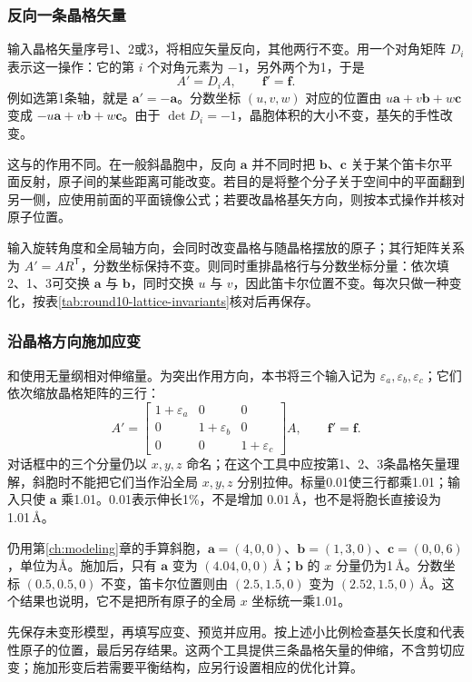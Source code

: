 \subsubsection{反向一条晶格矢量}

输入晶格矢量序号1、2或3，将相应矢量反向，其他两行不变。用一个对角矩阵 $D_i$ 表示这一操作：它的第 $i$ 个对角元素为 $-1$，另外两个为1，于是
\begin{equation}
 A'=D_iA,\qquad \mathbf f'=\mathbf f.
 \label{eq:mirror-lattice-row}
\end{equation}
例如选第1条轴，就是 $\mathbf a'=-\mathbf a$。分数坐标 $(u,v,w)$ 对应的位置由 $u\mathbf a+v\mathbf b+w\mathbf c$ 变成 $-u\mathbf a+v\mathbf b+w\mathbf c$。由于 $\det D_i=-1$，晶胞体积的大小不变，基矢的手性改变。

这与的作用不同。在一般斜晶胞中，反向 $\mathbf a$ 并不同时把 $\mathbf b$、$\mathbf c$ 关于某个笛卡尔平面反射，原子间的某些距离可能改变。若目的是将整个分子关于空间中的平面翻到另一侧，应使用前面的平面镜像公式；若要改晶格基矢方向，则按本式操作并核对原子位置。

输入旋转角度和全局轴方向，会同时改变晶格与随晶格摆放的原子；其行矩阵关系为 $A'=AR^{\mathsf T}$，分数坐标保持不变。则同时重排晶格行与分数坐标分量：依次填2、1、3可交换 $\mathbf a$ 与 $\mathbf b$，同时交换 $u$ 与 $v$，因此笛卡尔位置不变。每次只做一种变化，按表\ref{tab:round10-lattice-invariants}核对后再保存。

\subsubsection{沿晶格方向施加应变}

和使用无量纲相对伸缩量。为突出作用方向，本书将三个输入记为 $\varepsilon_a,\varepsilon_b,\varepsilon_c$；它们依次缩放晶格矩阵的三行：
\begin{equation}
 A'=\begin{bmatrix}
 1+\varepsilon_a&0&0\\
 0&1+\varepsilon_b&0\\
 0&0&1+\varepsilon_c
 \end{bmatrix}A,\qquad \mathbf f'=\mathbf f.
 \label{eq:lattice-axial-strain}
\end{equation}
对话框中的三个分量仍以 $x,y,z$ 命名；在这个工具中应按第1、2、3条晶格矢量理解，斜胞时不能把它们当作沿全局 $x,y,z$ 分别拉伸。标量0.01使三行都乘1.01；输入只使 $\mathbf a$ 乘1.01。0.01表示伸长1\%，不是增加 $0.01\,\text{\AA}$，也不是将胞长直接设为1.01\,\AA。

仍用第\ref{ch:modeling}章的手算斜胞，$\mathbf a=(4,0,0)$、$\mathbf b=(1,3,0)$、$\mathbf c=(0,0,6)$，单位为\AA。施加后，只有 $\mathbf a$ 变为 $(4.04,0,0)\,\text{\AA}$；$\mathbf b$ 的 $x$ 分量仍为1\,\AA。分数坐标 $(0.5,0.5,0)$ 不变，笛卡尔位置则由 $(2.5,1.5,0)$ 变为 $(2.52,1.5,0)\,\text{\AA}$。这个结果也说明，它不是把所有原子的全局 $x$ 坐标统一乘1.01。

先保存未变形模型，再填写应变、预览并应用。按上述小比例检查基矢长度和代表性原子的位置，最后另存结果。这两个工具提供三条晶格矢量的伸缩，不含剪切应变；施加形变后若需要平衡结构，应另行设置相应的优化计算。
